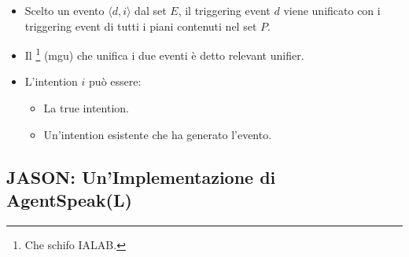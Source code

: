 \begin{itemize}
  \item Scelto un evento $\langle d, i \rangle$ dal set $E$, il triggering event $d$ viene unificato con i triggering event di tutti i piani contenuti nel set $P$. 
  \item Il \footnote{Che schifo IALAB.} (mgu) che unifica i due eventi è detto relevant unifier. 
  \item L'intention $i$ può essere:
    \begin{itemize}
      \item La true intention. 
      \item Un'intention esistente che ha generato l'evento.
    \end{itemize}
\end{itemize}


\subsection{JASON: Un'Implementazione di AgentSpeak(L)}





